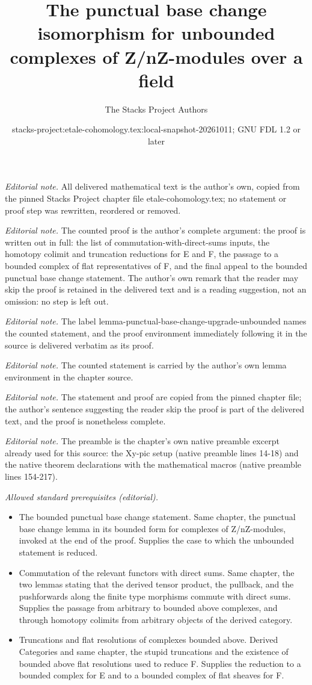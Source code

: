 \documentclass[10pt,a4paper]{amsart}
\title{The punctual base change isomorphism for unbounded complexes of Z/nZ-modules over a field}
\author{The Stacks Project Authors}
\date{stacks-project:etale-cohomology.tex:local-snapshot-20261011; GNU FDL 1.2 or later}
\theoremstyle{plain}
\theoremstyle{definition}
\theoremstyle{remark}
\numberwithin{equation}{subsection}
\begin{document}
\maketitle
\noindent\textit{Editorial note.} All delivered mathematical text is the author's own, copied from the pinned Stacks Project chapter file etale-cohomology.tex; no statement or proof step was rewritten, reordered or removed.\par\medskip
\noindent\textit{Editorial note.} The counted proof is the author's complete argument: the proof is written out in full: the list of commutation-with-direct-sums inputs, the homotopy colimit and truncation reductions for E and F, the passage to a bounded complex of flat representatives of F, and the final appeal to the bounded punctual base change statement. The author's own remark that the reader may skip the proof is retained in the delivered text and is a reading suggestion, not an omission: no step is left out.\par\medskip
\noindent\textit{Editorial note.} The label lemma-punctual-base-change-upgrade-unbounded names the counted statement, and the proof environment immediately following it in the source is delivered verbatim as its proof.\par\medskip
\noindent\textit{Editorial note.} The counted statement is carried by the author's own lemma environment in the chapter source.\par\medskip
\noindent\textit{Editorial note.} The statement and proof are copied from the pinned chapter file; the author's sentence suggesting the reader skip the proof is part of the delivered text, and the proof is nonetheless complete.\par\medskip
\noindent\textit{Editorial note.} The preamble is the chapter's own native preamble excerpt already used for this source: the Xy-pic setup (native preamble lines 14-18) and the native theorem declarations with the mathematical macros (native preamble lines 154-217).\par\medskip
\noindent\textit{Allowed standard prerequisites (editorial).}\begin{itemize}
\item The bounded punctual base change statement. Same chapter, the punctual base change lemma in its bounded form for complexes of Z/nZ-modules, invoked at the end of the proof. Supplies the case to which the unbounded statement is reduced.
\item Commutation of the relevant functors with direct sums. Same chapter, the two lemmas stating that the derived tensor product, the pullback, and the pushforwards along the finite type morphisms commute with direct sums. Supplies the passage from arbitrary to bounded above complexes, and through homotopy colimits from arbitrary objects of the derived category.
\item Truncations and flat resolutions of complexes bounded above. Derived Categories and same chapter, the stupid truncations and the existence of bounded above flat resolutions used to reduce F. Supplies the reduction to a bounded complex for E and to a bounded complex of flat sheaves for F.
\end{itemize}\medskip
\end{document}
